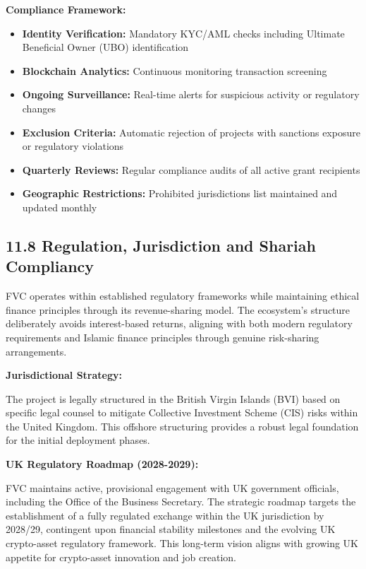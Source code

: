 \documentclass[
  paper=a4,
  ,captions=tableheading
]{scrartcl}
\providecommand{\tightlist}{%
  \setlength{\itemsep}{0pt}\setlength{\parskip}{0pt}}
\begin{document}
\textbf{Compliance Framework:}

\begin{itemize}
\tightlist
\item
  \textbf{Identity Verification:} Mandatory KYC/AML checks including
  Ultimate Beneficial Owner (UBO) identification
\item
  \textbf{Blockchain Analytics:} Continuous monitoring transaction
  screening
\item
  \textbf{Ongoing Surveillance:} Real-time alerts for suspicious
  activity or regulatory changes
\item
  \textbf{Exclusion Criteria:} Automatic rejection of projects with
  sanctions exposure or regulatory violations
\item
  \textbf{Quarterly Reviews:} Regular compliance audits of all active
  grant recipients
\item
  \textbf{Geographic Restrictions:} Prohibited jurisdictions list
  maintained and updated monthly
\end{itemize}

\subsection{11.8 Regulation, Jurisdiction and Shariah
Compliancy}\label{regulation-and-shariah-compliancy}

FVC operates within established regulatory frameworks while
maintaining ethical finance principles through its revenue-sharing
model. The ecosystem's structure deliberately avoids interest-based
returns, aligning with both modern regulatory requirements and Islamic
finance principles through genuine risk-sharing arrangements.

\textbf{Jurisdictional Strategy:}

The project is legally structured in the British Virgin Islands (BVI)
based on specific legal counsel to mitigate Collective Investment
Scheme (CIS) risks within the United Kingdom. This offshore structuring
provides a robust legal foundation for the initial deployment phases.

\textbf{UK Regulatory Roadmap (2028-2029):}

FVC maintains active, provisional engagement with UK government
officials, including the Office of the Business Secretary. The
strategic roadmap targets the establishment of a fully regulated
exchange within the UK jurisdiction by 2028/29, contingent upon
financial stability milestones and the evolving UK crypto-asset
regulatory framework. This long-term vision aligns with growing UK
appetite for crypto-asset innovation and job creation.
\end{document}
